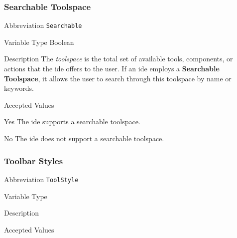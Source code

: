 \subsubsection{Searchable Toolspace}
\label{subsec:searchable}

\begin{AlignedDesc}
  \item[Abbreviation] \texttt{Searchable}

  \item[Variable Type] Boolean

  \item[Description] The \textit{toolspace} is the total set of available
  tools, components, or actions that the \ac{ide} offers to the user. If an
  \ac{ide} employs a \textbf{Searchable Toolspace}, it allows the user to
  search through this toolspace by name or keywords.

  \item[Accepted Values]

  \begin{AlignedDesc}
    \item[Yes] The \ac{ide} supports a searchable toolspace.
    \item[No] The \ac{ide} does not support a searchable toolspace.
  \end{AlignedDesc}

\end{AlignedDesc}

\subsubsection{Toolbar Styles}
\label{subsec:toolstyle}

\begin{AlignedDesc}
  \item[Abbreviation] \texttt{ToolStyle}

  \item[Variable Type]

  \item[Description]

  \item[Accepted Values]

  \begin{AlignedDesc}
    \item[\textellipsis]
  \end{AlignedDesc}

\end{AlignedDesc}


